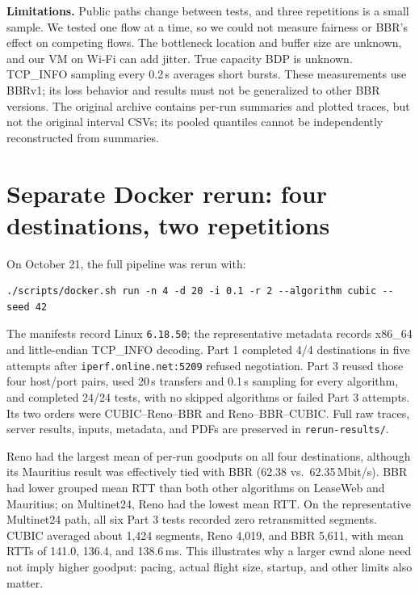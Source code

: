 \documentclass[11pt]{article}
\begin{document}
\textbf{Limitations.} Public paths change between tests, and three
repetitions is a small sample. We tested one flow at a time, so we could not
measure fairness or BBR's effect on competing flows. The bottleneck location
and buffer size are unknown, and our VM on Wi-Fi can add jitter. True
capacity BDP is unknown. TCP\_INFO sampling every 0.2\,s averages short
bursts. These measurements use BBRv1; its loss behavior and results must not
be generalized to other BBR versions. The original archive contains
per-run summaries and plotted traces, but not the original interval CSVs;
its pooled quantiles cannot be independently reconstructed from summaries.

\clearpage
\section*{Separate Docker rerun: four destinations, two repetitions}

On October 21, the full pipeline was rerun with:
\begin{lstlisting}
./scripts/docker.sh run -n 4 -d 20 -i 0.1 -r 2 --algorithm cubic --seed 42
\end{lstlisting}
The manifests record Linux \texttt{6.18.50}; the representative metadata
records x86\_64 and little-endian TCP\_INFO decoding. Part 1 completed 4/4
destinations in five attempts after \texttt{iperf.online.net:5209} refused
negotiation. Part 3 reused those four host/port pairs, used 20\,s transfers
and 0.1\,s sampling for every algorithm, and completed 24/24 tests, with no
skipped algorithms or failed Part 3 attempts. Its two orders were
CUBIC--Reno--BBR and Reno--BBR--CUBIC. Full raw traces, server results,
inputs, metadata, and PDFs are preserved in \texttt{rerun-results/}.



Reno had the largest mean of per-run goodputs on all four destinations,
although its Mauritius result was effectively tied with BBR
(62.38 vs.\ 62.35\,Mbit/s). BBR had lower grouped mean RTT than both other
algorithms on LeaseWeb and Mauritius; on Multinet24, Reno had the lowest
mean RTT. On the representative Multinet24 path, all six Part 3 tests
recorded zero retransmitted segments. CUBIC averaged about 1,424 segments,
Reno 4,019, and BBR 5,611, with mean RTTs of 141.0, 136.4, and 138.6\,ms.
This illustrates why a larger cwnd alone need not imply higher goodput:
pacing, actual flight size, startup, and other limits also matter.
\end{document}
